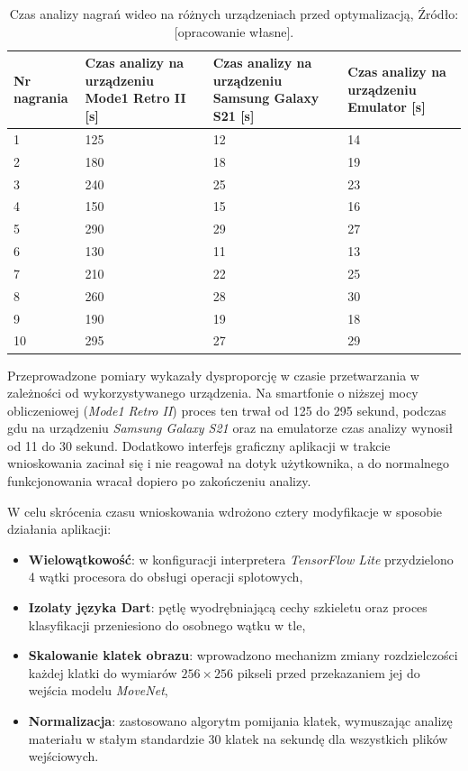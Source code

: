             \begin{table}[!ht] \centering
    \caption{Czas analizy nagrań wideo na różnych urządzeniach przed optymalizacją, Źródło: [opracowanie własne].}
    \label{tab:time_before} 
    \begin{tabularx}{\textwidth}{ | l | X | X | X | } \hline
        \textbf{Nr nagrania} & Czas analizy na urządzeniu \textbf{Mode1 Retro II [s]} & Czas analizy na urządzeniu \textbf{Samsung Galaxy S21 [s]} & Czas analizy na urządzeniu \textbf{Emulator [s]} \\ \hline
        1 & 125 & 12 & 14 \\ \hline
        2 & 180 & 18 & 19 \\ \hline
        3 & 240 & 25 & 23 \\ \hline
        4 & 150 & 15 & 16 \\ \hline
        5 & 290 & 29 & 27 \\ \hline
        6 & 130 & 11 & 13 \\ \hline
        7 & 210 & 22 & 25 \\ \hline
        8 & 260 & 28 & 30 \\ \hline
        9 & 190 & 19 & 18 \\ \hline
        10 & 295 & 27 & 29 \\ \hline
    \end{tabularx}
\end{table}

        Przeprowadzone pomiary wykazały dysproporcję w czasie przetwarzania w zależności od wykorzystywanego urządzenia. Na smartfonie o niższej mocy obliczeniowej (\textit{Mode1 Retro II}) proces ten trwał od 125 do 295 sekund, podczas gdu na urządzeniu \textit{Samsung Galaxy S21} oraz na emulatorze czas analizy wynosił od 11 do 30 sekund. Dodatkowo interfejs graficzny aplikacji w trakcie wnioskowania zacinał się i nie reagował na dotyk użytkownika, a do normalnego funkcjonowania wracał dopiero po zakończeniu analizy.

        W celu skrócenia czasu wnioskowania wdrożono cztery modyfikacje w sposobie działania aplikacji:

        \begin{itemize}
            \item \textbf{Wielowątkowość}: w konfiguracji interpretera \textit{TensorFlow Lite} przydzielono 4 wątki procesora do obsługi operacji splotowych,
            \item \textbf{Izolaty języka Dart}: pętlę wyodrębniającą cechy szkieletu oraz proces klasyfikacji przeniesiono do osobnego wątku w tle,
            \item \textbf{Skalowanie klatek obrazu}: wprowadzono mechanizm zmiany rozdzielczości każdej klatki do wymiarów $256\times 256$ pikseli przed przekazaniem jej do wejścia modelu \textit{MoveNet},
            \item \textbf{Normalizacja}: zastosowano algorytm pomijania klatek, wymuszając analizę materiału w stałym standardzie 30 klatek na sekundę dla wszystkich plików wejściowych.
        \end{itemize}

